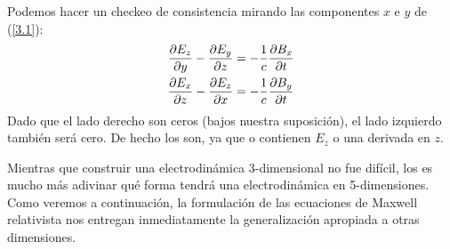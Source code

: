 Podemos hacer un checkeo de consistencia mirando las componentes $x$ e $y$ de (\ref{3.1}):
\begin{align}
    \pdv{E_z}{y}-\pdv{E_y}{z}&=-\frac{1}{c}\pdv{B_x}{t}\\
    \pdv{E_x}{z}-\pdv{E_z}{x}&=-\frac{1}{c}\pdv{B_y}{t}
\end{align}
Dado que el lado derecho son ceros (bajos nuestra suposición), el lado izquierdo también será cero. De hecho los son, ya que o contienen $E_z$ o una derivada en $z$. 

Mientras que construir una electrodinámica 3-dimensional no fue difícil, los es mucho más adivinar qué forma tendrá una electrodinámica en 5-dimensiones. Como veremos a continuación, la formulación de las ecuaciones de Maxwell relativista nos entregan inmediatamente la generalización apropiada a otras dimensiones.

